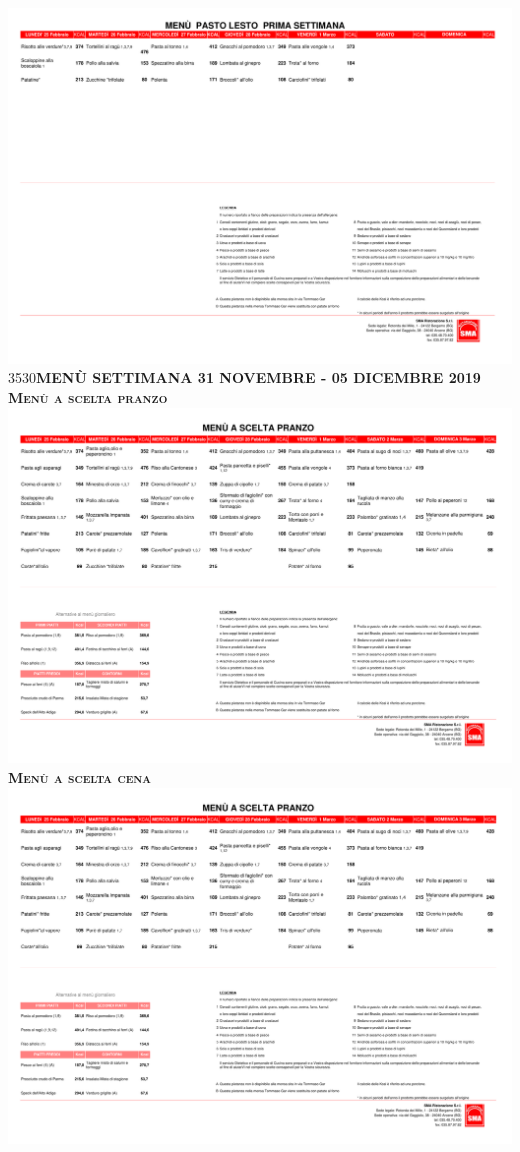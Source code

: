 \documentclass{article}
\makeatletter
\newcommand\HUGE{\@setfontsize\Huge{35}{30}}
\newcommand{\frasedue}{MENÙ SETTIMANA 31 NOVEMBRE - 05 DICEMBRE 2019}
\makeatother
\begin{document}
\begin{center}
\includegraphics[trim=0cm 23cm 0cm 2cm,clip,page=1,width=\textwidth,]{lesto.pdf}
\newpage
{\HUGE \color{red}\textbf{\frasedue}}\\
\vspace{0.7cm}
{\Huge \textbf{\textsc{Menù a scelta pranzo}}}\\
\includegraphics[trim=0cm 16cm 0cm 2cm,clip,page=3,width=\textwidth,]{scelta.pdf}
\vspace{0.3cm}
{\Huge \textbf{\textsc{Menù a scelta cena}}}\\
\includegraphics[trim=0cm 17cm 0cm 2cm,clip,page=4,width=\textwidth,]{scelta.pdf}

\end{center}
\end{document}
